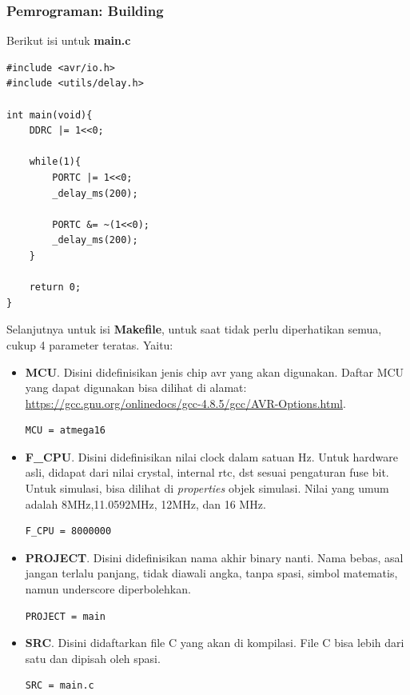 \documentclass[12pt,]{article}
\begin{document}
	\newpage
	\subsubsection{Pemrograman: Building}
	
	Berikut isi untuk \textbf{main.c}
	\begin{verbatim}
#include <avr/io.h>
#include <utils/delay.h>

int main(void){
	DDRC |= 1<<0;
	
	while(1){
		PORTC |= 1<<0;
		_delay_ms(200);
		
		PORTC &= ~(1<<0);
		_delay_ms(200);
	}
	
	return 0;
}
	\end{verbatim}
	
	Selanjutnya untuk isi \textbf{Makefile}, untuk saat tidak perlu diperhatikan semua, cukup 4 parameter teratas.
	Yaitu:
	\begin{itemize}
		\item \textbf{MCU}. Disini didefinisikan jenis chip avr yang akan digunakan.
		Daftar MCU yang dapat digunakan bisa dilihat di alamat:\\
		\url{https://gcc.gnu.org/onlinedocs/gcc-4.8.5/gcc/AVR-Options.html}.
		
		\begin{verbatim}
MCU = atmega16
		\end{verbatim}
		
		\item \textbf{F\_CPU}. Disini didefinisikan nilai clock dalam satuan Hz.
		Untuk hardware asli, didapat dari nilai crystal, internal rtc, dst sesuai pengaturan fuse bit.
		Untuk simulasi, bisa dilihat di \textit{properties} objek simulasi.
		Nilai yang umum adalah 8MHz,11.0592MHz, 12MHz, dan 16 MHz.
		\begin{verbatim}
F_CPU = 8000000
		\end{verbatim}
		
		\item \textbf{PROJECT}. Disini didefinisikan nama akhir binary nanti.
		Nama bebas, asal jangan terlalu panjang, tidak diawali angka, tanpa spasi, simbol matematis, namun underscore diperbolehkan.
		\begin{verbatim}
PROJECT = main
		\end{verbatim}
		
		\item \textbf{SRC}. Disini didaftarkan file C yang akan di kompilasi.
		File C bisa lebih dari satu dan dipisah oleh spasi.
		\begin{verbatim}
SRC = main.c
		\end{verbatim}
	\end{itemize}
\end{document}

